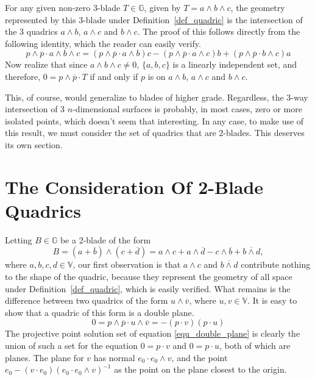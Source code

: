 \documentclass{ecgd-l}
\newcommand{\G}{\mathbb{G}}
\newcommand{\V}{\mathbb{V}}
\theoremstyle{definition}
\theoremstyle{remark}
\numberwithin{equation}{section}
\begin{document}
For any given non-zero 3-blade $T\in\G$, given by $T=a\wedge b\wedge c$, the
geometry represented by this 3-blade under Definition~\ref{def_quadric} is the intersection
of the 3 quadrics $a\wedge b$, $a\wedge c$ and $b\wedge c$.
The proof of this follows directly from the following identity, which the reader can easily verify.
\begin{equation}
p\wedge\overline{p}\cdot a\wedge b\wedge c
 = (p\wedge\overline{p}\cdot a\wedge b)c
 - (p\wedge\overline{p}\cdot a\wedge c)b
 + (p\wedge\overline{p}\cdot b\wedge c)a
\end{equation}
Now realize that since $a\wedge b\wedge c\neq 0$, $\{a,b,c\}$ is a linearly
independent set, and therefore, $0=p\wedge\overline{p}\cdot T$ if and
only if $p$ is on $a\wedge b$, $a\wedge c$ and $b\wedge c$.

This, of course, would generalize to blades of higher grade.  Regardless, the
3-way intersection of 3 $n$-dimensional surfaces is probably, in most cases,
zero or more isolated points, which doesn't seem that interesting.  In any case,
to make use of this result, we must consider
the set of quadrics that are 2-blades.  This deserves its own section.

\section{The Consideration Of 2-Blade Quadrics}

Letting $B\in\G$ be a 2-blade of the form
\begin{equation}\label{equ_two_blade_quadric}
B = (a+\overline{b})\wedge(c+\overline{d}) = a\wedge c + a\wedge\overline{d} - c\wedge\overline{b} + \overline{b\wedge d},
\end{equation}
where $a,b,c,d\in\V$, our first observation is that $a\wedge c$ and $\overline{b\wedge d}$ contribute nothing
to the shape of the quadric, because they represent the geometry of all space under
Definition~\ref{def_quadric}, which is easily verified.  What remains is the difference
between two quadrics of the form $u\wedge\overline{v}$, where $u,v\in\V$.  It is
easy to show that a quadric of this form is a double plane.
\begin{equation}\label{equ_double_plane}
0 = p\wedge\overline{p}\cdot u\wedge\overline{v} = -(p\cdot v)(p\cdot u)
\end{equation}
The projective point solution set of equation \eqref{equ_double_plane} is
clearly the union of such a set for the equation $0=p\cdot v$ and $0=p\cdot u$,
both of which are planes.  The plane for $v$ has normal $e_0\cdot e_0\wedge v$,
and the point $e_0-(v\cdot e_0)(e_0\cdot e_0\wedge v)^{-1}$ as the point on the plane closest to the origin.
\end{document}
